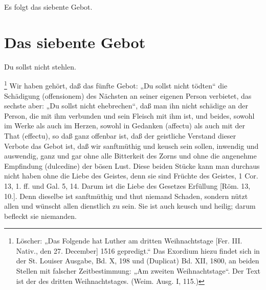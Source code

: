 Es folgt das siebente Gebot.

\section{Das siebente Gebot}

\begin{schriftzitat}
Du sollst nicht stehlen.
\end{schriftzitat}

\footnote{Löscher: „Das Folgende hat Luther am dritten Weihnachtstage [Fer. III. Nativ., den 27. December] 1516 gepredigt.“ Das Exordium hiezu findet sich in der St. Louiser Ausgabe, Bd. X, 198 und (Duplicat) Bd. XII, 1800, an beiden Stellen mit falscher Zeitbestimmung: „Am zweiten Weihnachtstage“. Der Text ist der des dritten Weihnachtstages. (Weim. Ausg. I, 115.)} Wir haben gehört, daß das fünfte Gebot: „Du sollst nicht tödten“ die Schädigung (offensionem) des Nächsten an seiner eigenen Person verbietet, das sechste aber: „Du sollst nicht ehebrechen“, daß man ihn nicht schädige an der Person, die mit ihm verbunden und sein Fleisch mit ihm ist, und beides, sowohl im Werke als auch im Herzen, sowohl in Gedanken (affectu) als auch mit der That (effectu), so daß ganz offenbar ist, daß der geistliche Verstand dieser Verbote das Gebot ist, daß wir sanftmüthig und keusch sein sollen, inwendig und auswendig, ganz und gar ohne alle Bitterkeit des Zorns und ohne die angenehme Empfindung (dulcedine) der bösen Lust. Diese beiden Stücke kann man durchaus nicht haben ohne die Liebe des Geistes, denn sie sind Früchte des Geistes, 1 Cor. 13, 1. ff. und Gal. 5, 14. Darum ist die Liebe des Gesetzes Erfüllung [Röm. 13, 10.]. Denn dieselbe ist sanftmüthig und thut niemand Schaden, sondern nützt allen und wünscht allen dienstlich zu sein. Sie ist auch keusch und heilig; darum befleckt sie niemanden.

